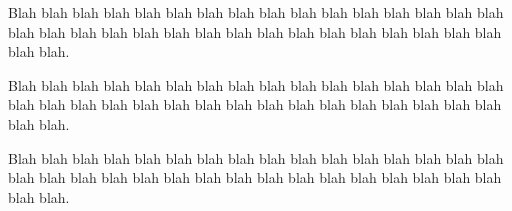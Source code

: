 \documentclass[pdfa]{drdc-report}
\begin{document}
Blah blah blah blah blah blah blah blah blah blah blah blah blah blah
blah blah blah blah blah blah blah blah blah blah blah blah blah blah
blah blah blah blah blah blah.



Blah blah blah blah blah blah blah blah blah blah blah blah blah blah
blah blah blah blah blah blah blah blah blah blah blah blah blah blah
blah blah blah blah blah blah.

Blah blah blah blah blah blah blah blah blah blah blah blah blah blah
blah blah blah blah blah blah blah blah blah blah blah blah blah blah
blah blah blah blah blah blah.
\docctl

\makebackcover



\end{document}
